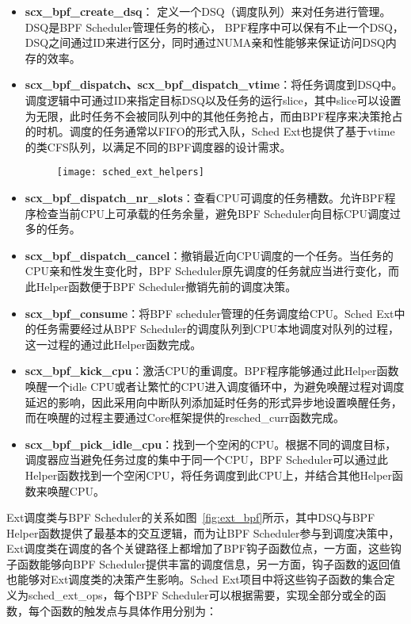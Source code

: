 \begin{itemize}
    \item \textbf{scx\_bpf\_create\_dsq}： 定义一个DSQ（调度队列）来对任务进行管理。DSQ是BPF Scheduler管理任务的核心， BPF程序中可以保有不止一个DSQ，DSQ之间通过ID来进行区分，同时通过NUMA亲和性能够来保证访问DSQ内存的效率。
    \item \textbf{scx\_bpf\_dispatch、scx\_bpf\_dispatch\_vtime}：将任务调度到DSQ中。调度逻辑中可通过ID来指定目标DSQ以及任务的运行slice，其中slice可以设置为无限，此时任务不会被同队列中的其他任务抢占，而由BPF程序来决策抢占的时机。调度的任务通常以FIFO的形式入队，Sched Ext也提供了基于vtime的类CFS队列，以满足不同的BPF调度器的设计需求。

    \begin{figure}[!htbp]
        \centering
        \texttt{[image: sched\_ext\_helpers]}
        \label{fig:sched_ext_helpers}
    \end{figure}
    
    \item \textbf{scx\_bpf\_dispatch\_nr\_slots}：查看CPU可调度的任务槽数。允许BPF程序检查当前CPU上可承载的任务余量，避免BPF Scheduler向目标CPU调度过多的任务。
    \item \textbf{scx\_bpf\_dispatch\_cancel}：撤销最近向CPU调度的一个任务。当任务的CPU亲和性发生变化时，BPF Scheduler原先调度的任务就应当进行变化，而此Helper函数便于BPF Scheduler撤销先前的调度决策。
    \item \textbf{scx\_bpf\_consume}：将BPF scheduler管理的任务调度给CPU。Sched Ext中的任务需要经过从BPF Scheduler的调度队列到CPU本地调度对队列的过程，这一过程的通过此Helper函数完成。
    \item \textbf{scx\_bpf\_kick\_cpu}：激活CPU的重调度。BPF程序能够通过此Helper函数唤醒一个idle CPU或者让繁忙的CPU进入调度循环中，为避免唤醒过程对调度延迟的影响，因此采用向中断队列添加延时任务的形式异步地设置唤醒任务，而在唤醒的过程主要通过Core框架提供的resched\_curr函数完成。
    \item \textbf{scx\_bpf\_pick\_idle\_cpu}：找到一个空闲的CPU。根据不同的调度目标，调度器应当避免任务过度的集中于同一个CPU，BPF Scheduler可以通过此Helper函数找到一个空闲CPU，将任务调度到此CPU上，并结合其他Helper函数来唤醒CPU。
\end{itemize}

Ext调度类与BPF Scheduler的关系如图~\ref{fig:ext_bpf}所示，其中DSQ与BPF Helper函数提供了最基本的交互逻辑，而为让BPF Scheduler参与到调度决策中，Ext调度类在调度的各个关键路径上都增加了BPF钩子函数位点，一方面，这些钩子函数能够向BPF Scheduler提供丰富的调度信息，另一方面，钩子函数的返回值也能够对Ext调度类的决策产生影响。Sched Ext项目中将这些钩子函数的集合定义为sched\_ext\_ops，每个BPF Scheduler可以根据需要，实现全部分或全的函数，每个函数的触发点与具体作用分别为：

